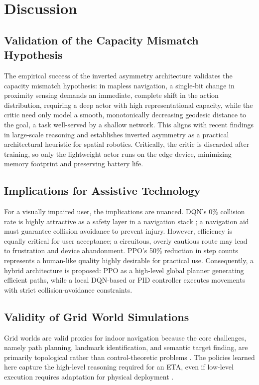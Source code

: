 \documentclass{article}
\begin{document}
\section{Discussion}

\subsection{Validation of the Capacity Mismatch Hypothesis}

The empirical success of the inverted asymmetry architecture validates the
capacity mismatch hypothesis: in mapless navigation, a single-bit change in
proximity sensing demands an immediate, complete shift in the action distribution,
requiring a deep actor with high representational capacity, while the critic
need only model a smooth, monotonically decreasing geodesic distance to the goal,
a task well-served by a shallow network. This aligns with recent findings in
large-scale reasoning \cite{liu2025} and establishes inverted asymmetry as a
practical architectural heuristic for spatial robotics. Critically, the critic
is discarded after training, so only the lightweight actor runs on the edge
device, minimizing memory footprint and preserving battery life.

\subsection{Implications for Assistive Technology}

For a visually impaired user, the implications are nuanced. DQN's 0\% collision
rate is highly attractive as a safety layer in a navigation stack \cite{hsu2021};
a navigation aid must guarantee collision avoidance to prevent injury. However,
efficiency is equally critical for user acceptance; a circuitous, overly cautious
route may lead to frustration and device abandonment. PPO's 50\% reduction in
step counts represents a human-like quality highly desirable for practical use.
Consequently, a hybrid architecture is proposed: PPO as a high-level global
planner generating efficient paths, while a local DQN-based or PID controller
executes movements with strict collision-avoidance constraints.

\subsection{Validity of Grid World Simulations}

Grid worlds are valid proxies for indoor navigation because the core challenges,
namely path planning, landmark identification, and semantic target finding, are
primarily topological rather than control-theoretic problems \cite{choi2020}.
The policies learned here capture the high-level reasoning required for an ETA,
even if low-level execution requires adaptation for physical deployment
\cite{arce2023}.
\end{document}
